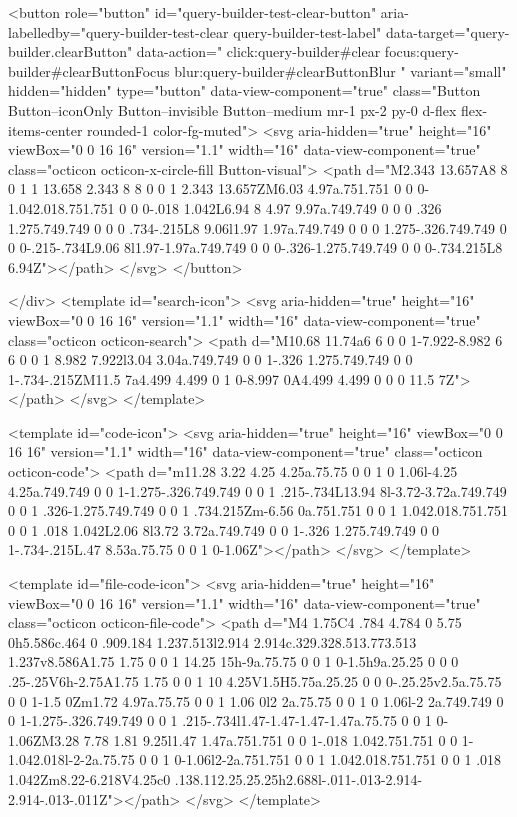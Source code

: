           <button role="button" id="query-builder-test-clear-button" aria-labelledby="query-builder-test-clear query-builder-test-label" data-target="query-builder.clearButton" data-action="
                click:query-builder#clear
                focus:query-builder#clearButtonFocus
                blur:query-builder#clearButtonBlur
              " variant="small" hidden="hidden" type="button" data-view-component="true" class="Button Button--iconOnly Button--invisible Button--medium mr-1 px-2 py-0 d-flex flex-items-center rounded-1 color-fg-muted">  <svg aria-hidden="true" height="16" viewBox="0 0 16 16" version="1.1" width="16" data-view-component="true" class="octicon octicon-x-circle-fill Button-visual">
    <path d="M2.343 13.657A8 8 0 1 1 13.658 2.343 8 8 0 0 1 2.343 13.657ZM6.03 4.97a.751.751 0 0 0-1.042.018.751.751 0 0 0-.018 1.042L6.94 8 4.97 9.97a.749.749 0 0 0 .326 1.275.749.749 0 0 0 .734-.215L8 9.06l1.97 1.97a.749.749 0 0 0 1.275-.326.749.749 0 0 0-.215-.734L9.06 8l1.97-1.97a.749.749 0 0 0-.326-1.275.749.749 0 0 0-.734.215L8 6.94Z"></path>
</svg>
</button>

      </div>
      <template id="search-icon">
  <svg aria-hidden="true" height="16" viewBox="0 0 16 16" version="1.1" width="16" data-view-component="true" class="octicon octicon-search">
    <path d="M10.68 11.74a6 6 0 0 1-7.922-8.982 6 6 0 0 1 8.982 7.922l3.04 3.04a.749.749 0 0 1-.326 1.275.749.749 0 0 1-.734-.215ZM11.5 7a4.499 4.499 0 1 0-8.997 0A4.499 4.499 0 0 0 11.5 7Z"></path>
</svg>
</template>

<template id="code-icon">
  <svg aria-hidden="true" height="16" viewBox="0 0 16 16" version="1.1" width="16" data-view-component="true" class="octicon octicon-code">
    <path d="m11.28 3.22 4.25 4.25a.75.75 0 0 1 0 1.06l-4.25 4.25a.749.749 0 0 1-1.275-.326.749.749 0 0 1 .215-.734L13.94 8l-3.72-3.72a.749.749 0 0 1 .326-1.275.749.749 0 0 1 .734.215Zm-6.56 0a.751.751 0 0 1 1.042.018.751.751 0 0 1 .018 1.042L2.06 8l3.72 3.72a.749.749 0 0 1-.326 1.275.749.749 0 0 1-.734-.215L.47 8.53a.75.75 0 0 1 0-1.06Z"></path>
</svg>
</template>

<template id="file-code-icon">
  <svg aria-hidden="true" height="16" viewBox="0 0 16 16" version="1.1" width="16" data-view-component="true" class="octicon octicon-file-code">
    <path d="M4 1.75C4 .784 4.784 0 5.75 0h5.586c.464 0 .909.184 1.237.513l2.914 2.914c.329.328.513.773.513 1.237v8.586A1.75 1.75 0 0 1 14.25 15h-9a.75.75 0 0 1 0-1.5h9a.25.25 0 0 0 .25-.25V6h-2.75A1.75 1.75 0 0 1 10 4.25V1.5H5.75a.25.25 0 0 0-.25.25v2.5a.75.75 0 0 1-1.5 0Zm1.72 4.97a.75.75 0 0 1 1.06 0l2 2a.75.75 0 0 1 0 1.06l-2 2a.749.749 0 0 1-1.275-.326.749.749 0 0 1 .215-.734l1.47-1.47-1.47-1.47a.75.75 0 0 1 0-1.06ZM3.28 7.78 1.81 9.25l1.47 1.47a.751.751 0 0 1-.018 1.042.751.751 0 0 1-1.042.018l-2-2a.75.75 0 0 1 0-1.06l2-2a.751.751 0 0 1 1.042.018.751.751 0 0 1 .018 1.042Zm8.22-6.218V4.25c0 .138.112.25.25.25h2.688l-.011-.013-2.914-2.914-.013-.011Z"></path>
</svg>
</template>

